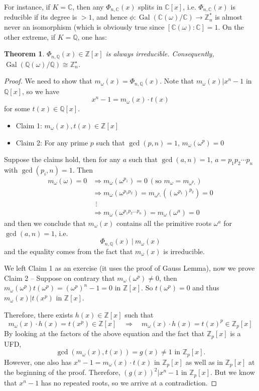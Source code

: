 \documentclass[11pt]{book}
\newtheorem{theorem}{Theorem}[section]
\begin{document}
For instance, if $K = \mathbb{C}$, then any $\Phi_{n,\mathbb{C}}(x)$ splits in $\mathbb{C}[x]$, i.e. $\Phi_{n,\mathbb{C}}(x)$ is reducible if its degree is $> 1$, and hence $\phi: \operatorname{Gal}(\mathbb{C}(\omega)/\mathbb{C}) \to \mathbb{Z}_n^*$ is almost never an isomorphism (which is obviously true since $[\mathbb{C}(\omega):\mathbb{C}] = 1$. On the other extreme, if $K = \mathbb{Q}$, one has:
\begin{theorem}
    $\Phi_{n,\mathbb{Q}}(x)\in \mathbb{Z}[x]$ is always irreducible. Consequently, $\operatorname{Gal}(\mathbb{Q}(\omega)/\mathbb{Q}) \cong \mathbb{Z}_n^\star$.
\end{theorem}
\begin{proof}
    We need to show that $m_\omega(x)=\Phi_{n,\mathbb{Q}}(x)$. Note that $m_\omega(x)|x^n-1$ in $\mathbb{Q}[x]$, so we have 
    $$x^n-1=m_\omega(x) \cdot t(x)$$
    for some $t(x) \in \mathbb{Q}[x]$.
    \begin{itemize}
        \item Claim 1: $m_\omega(x), t(x) \in \mathbb{Z}[x]$
        \item Claim 2: For any prime $p$ such that $\operatorname{gcd}(p,n)=1$, $m_{\omega}(\omega^p)=0$
    \end{itemize}
    Suppose the claims hold, then for any $a$ such that $\operatorname{gcd}(a,n)=1$, $a=p_1p_2\cdots p_n$ with $\gcd(p_i,n) = 1$. Then 
    \begin{align*}
    m_\omega(\omega)=0 &\Rightarrow m_\omega(\omega^{p_1})=0\ (\text{so } m_{\omega} = m_{\omega^{p_1}}) \\ &\Rightarrow m_\omega(\omega^{p_1p_2})=m_{\omega^{p_1}}((\omega^{p_1})^{p_2})=0 \\ 
    &\ \ \vdots \\
    &\Rightarrow m_\omega(\omega^{p_1p_2\dots p_n}) = m_\omega(\omega^a)=0\end{align*}
    and then we conclude that $m_\omega(x) $ contains all the primitive roots $\omega^a$ for $\gcd(a,n) =1$, i.e.
    $$\Phi_{n,\mathbb{Q}}(x)\ |\ m_\omega(x)$$
    and the equality comes from the fact that $m_{\omega}(x)$ is irreducible.
    
    \medskip
    We left Claim 1 as an exercise (it uses the proof of Gauss Lemma), now we prove Claim 2 -- Suppose on contrary that $m_\omega(\omega^p)\neq 0$, then $m_\omega(\omega^p)t(\omega^p)=(\omega^p)^n-1=0 $ in $\mathbb{Z}[x]$. So $t(\omega^p)=0$ and thus $m_\omega(x)|t(x^p)$ in $\mathbb{Z}[x]$. 
    
    Therefore, there exists $h(x) \in \mathbb{Z}[x]$ such that
    $$m_\omega(x)\cdot h(x)=t(x^p) \in \mathbb{Z}[x]\quad \Rightarrow \quad m_\omega(x) \cdot h(x)=t(x)^p \in \mathbb{Z}_p[x]  $$
   By looking at the factors of the above equation and the fact that $\mathbb{Z}_p[x]$ is a UFD, 
   $$\operatorname{gcd}(m_\omega(x),t(x))=g(x)\neq 1 \text{  in  } \mathbb{Z}_p[x].$$ 
    However, one also has $x^n-1=m_\omega(x) \cdot t(x)$ in $\mathbb{Z}_p[x]$ as well as in $\mathbb{Z}_p[x]$ at the beginning of the proof. Therefore, 
   $(g(x))^2|x^n-1$ in $\mathbb{Z}_p[x]$. But we know that $x^n-1 $ has no repeated roots, so we arrive at a contradiction.
\end{proof}
\end{document}
